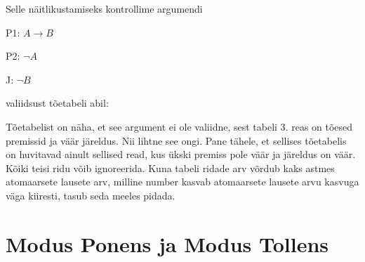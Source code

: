 \documentclass[]{book}
\newenvironment{Shaded}{\begin{snugshade}}{\end{snugshade}}
\newcommand{\CommentTok}[1]{\textcolor[rgb]{0.56,0.35,0.01}{\textit{#1}}}
\newcommand{\DataTypeTok}[1]{\textcolor[rgb]{0.13,0.29,0.53}{#1}}
\newcommand{\KeywordTok}[1]{\textcolor[rgb]{0.13,0.29,0.53}{\textbf{#1}}}
\newcommand{\NormalTok}[1]{#1}
\newcommand{\StringTok}[1]{\textcolor[rgb]{0.31,0.60,0.02}{#1}}
\begin{document}
Selle näitlikustamiseks kontrollime argumendi

P1: \(A \rightarrow B\)

P2: \(\neg A\)

J: \(\neg B\)

valiidsust tõetabeli abil:

\begin{Shaded}
\end{Shaded}

Tõetabelist on näha, et see argument ei ole valiidne, sest tabeli 3. reas on tõesed premissid ja väär järeldus. Nii lihtne see ongi. Pane tähele, et sellises tõetabelis on huvitavad ainult sellised read, kus ükski premiss pole väär ja järeldus on väär. Kõiki teisi ridu võib ignoreerida. Kuna tabeli ridade arv võrdub kaks astmes atomaarsete lausete arv, milline number kasvab atomaarsete lausete arvu kasvuga väga kiiresti, tasub seda meeles pidada.

\hypertarget{modus-ponens-ja-modus-tollens}{%
\section{Modus Ponens ja Modus Tollens}\label{modus-ponens-ja-modus-tollens}}
\end{document}

